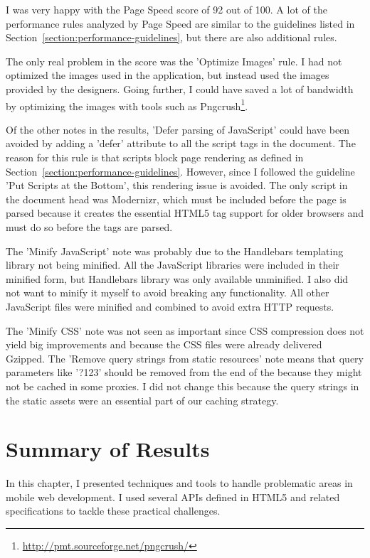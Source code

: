 I was very happy with the Page Speed score of 92 out of 100. A lot of
the performance rules analyzed by Page Speed are similar to the
guidelines listed in Section~\ref{section:performance-guidelines}, but
there are also additional rules.

The only real problem in the score was the 'Optimize Images' rule. I
had not optimized the images used in the application, but instead used
the images provided by the designers. Going further, I could have
saved a lot of bandwidth by optimizing the images with tools such as
Pngcrush\footnote{\url{http://pmt.sourceforge.net/pngcrush/}}.

Of the other notes in the results, 'Defer parsing of JavaScript' could
have been avoided by adding a 'defer' attribute to all the script tags
in the document. The reason for this rule is that scripts block page
rendering as defined in
Section~\ref{section:performance-guidelines}. However, since I
followed the guideline 'Put Scripts at the Bottom', this rendering
issue is avoided. The only script in the document head was Modernizr,
which must be included before the page is parsed because it creates
the essential HTML5 tag support for older browsers and must do so
before the tags are parsed.

The 'Minify JavaScript' note was probably due to the Handlebars
templating library not being minified. All the JavaScript libraries
were included in their minified form, but Handlebars library was only
available unminified. I also did not want to minify it myself to avoid
breaking any functionality. All other JavaScript files were minified
and combined to avoid extra HTTP requests.

The 'Minify CSS' note was not seen as important since CSS compression
does not yield big improvements and because the CSS files were already
delivered Gzipped. The 'Remove query strings from static resources'
note means that query parameters like '?123' should be removed from
the end of the  because they might not be cached in some
proxies. I did not change this because the query strings in the static
assets were an essential part of our caching strategy.

\section{Summary of Results}

In this chapter, I presented techniques and tools to handle
problematic areas in mobile web development. I used several APIs
defined in HTML5 and related specifications to tackle these practical
challenges.

